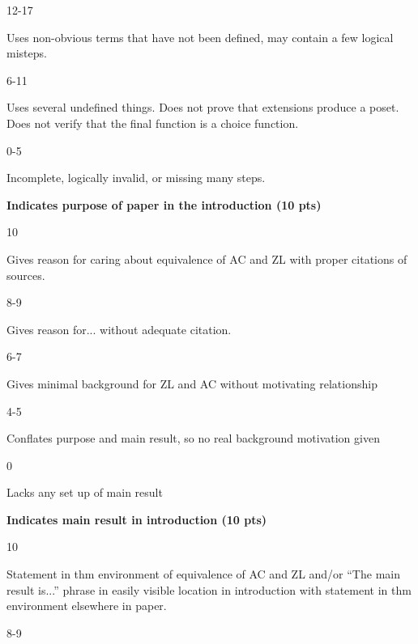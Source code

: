 \documentclass{article}
\begin{document}
    12-17
    \par
    Uses non-obvious terms that have not been defined, may contain a few
    logical misteps.
    \par\hfill\par
    6-11
    \par
    Uses several undefined things. Does not prove that extensions produce
    a poset. Does not verify that the final function is a choice function.
    \par\hfill\par
    0-5
    \par
    Incomplete, logically invalid, or missing many steps.
    \par\hfill\par
    \textbf{Indicates purpose of paper in the introduction (10 pts)}
    \par\hfill\par
    10
    \par
    Gives reason for caring about equivalence of AC and ZL
    with proper citations of sources.
    \par\hfill\par
    8-9
    \par
    Gives reason for... without adequate citation.
    \par\hfill\par
    6-7
    \par
    Gives minimal background for ZL and AC without motivating relationship
    \par\hfill\par
    4-5
    \par
    Conflates purpose and main result, so no real background motivation given
    \par\hfill\par
    0
    \par
    Lacks any set up of main result
    \par\hfill\par
    \textbf{Indicates main result in introduction (10 pts)}
    \par\hfill\par
    10
    \par
    Statement in thm environment of equivalence of AC and ZL and/or
    ``The main result is...'' phrase in easily visible location in
    introduction with statement in thm environment elsewhere in paper.
    \par\hfill\par
    8-9
    \par
\end{document}
